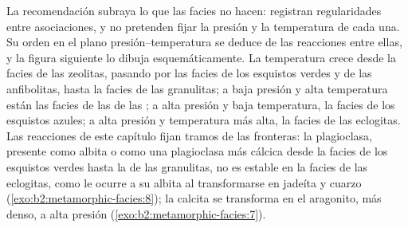La recomendación subraya lo que las facies no hacen: registran regularidades entre
asociaciones, y no pretenden fijar la presión y la temperatura de cada una. Su orden en
el plano presión--temperatura se deduce de las reacciones entre ellas, y la
figura siguiente lo dibuja esquemáticamente. La temperatura crece desde la facies de las zeolitas, pasando por
las facies de los esquistos verdes y de las anfibolitas, hasta la facies de las granulitas; a baja presión y alta
temperatura están las facies de las  de las ; a alta presión y baja
temperatura, la facies de los esquistos azules; a alta presión y temperatura más alta, la
facies de las eclogitas. Las reacciones de este capítulo fijan tramos de las fronteras: la plagioclasa,
presente como albita o como una plagioclasa más cálcica desde la facies de los esquistos verdes hasta la de las granulitas,
no es estable en la facies de las eclogitas, como le ocurre a su
albita al transformarse en jadeíta y cuarzo (\cref{exo:b2:metamorphic-facies:8}); la calcita se transforma en el
aragonito, más denso, a alta presión (\cref{exo:b2:metamorphic-facies:7}).

